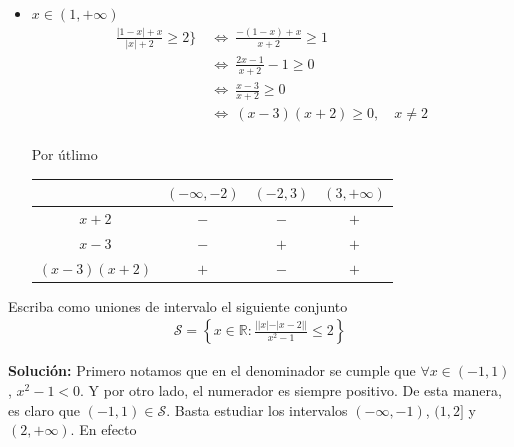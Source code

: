 \documentclass[12pt]{book}
\begin{document}
\begin{itemize}
\item $x \in (1,+\infty)$
\begin{align*}
    \frac{|1-x|+x}{|x|+2}\geq2\} \ &\Longleftrightarrow \ \frac{-(1-x)+x}{x+2} \geq 1\\
    &\Longleftrightarrow \ \frac{2x-1}{x+2}-1 \geq 0 \\
     &\Longleftrightarrow \ \frac{x-3}{x+2} \geq 0 \\
      &\Longleftrightarrow \ (x-3)(x+2) \geq 0 , \quad x \neq 2\\
\end{align*}

Por útlimo

\begin{center}
\begin{tabular}{|c|c|c|c|}
\hline
   & $(-\infty,-2) $  & $(-2,3)$ & $(3,+\infty)$ \\
   \hline
   $x+2$ & $-$ &$-$ &  $+$ \\ \hline
   $x-3$ & $-$ & $+$ & $+$ \\ \hline \hline
\rule{0pt}{0pt} $\displaystyle (x-3)(x+2)$ & $+$ & $-$ & $+$ \\
   \hline
\end{tabular}
\end{center}
\end{itemize}

\begin{prob}{}{}
    Escriba como uniones de intervalo el siguiente conjunto
\begin{align*}
 \mathcal{S}=\left\{x \in \mathbb{R}:   \frac{||x|-|x-2||}{x^2-1}\leq2 \right\}
\end{align*}
\end{prob}
\textbf{Solución:}
Primero notamos que en el denominador se cumple que $\forall x \in (-1,1)$, $x^2-1<0$. Y por otro lado, el numerador es siempre positivo. De esta manera, es claro que $(-1,1) \in \mathcal{S}$. Basta estudiar los intervalos $(-\infty,-1)$, $(1,2]$ y $(2,+\infty)$. En efecto
\end{document}
